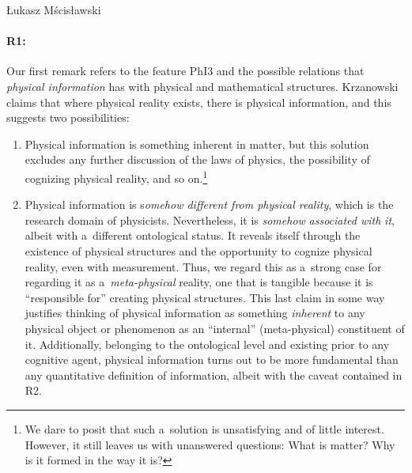 \begin{artengenv}{Łukasz Mścisławski}
\paragraph{R1:} Our first remark refers to the feature PhI3 and the possible relations that \textit{physical information} has with physical and mathematical structures. Krzanowski claims that where physical reality exists, there is physical information, and this suggests two possibilities:
\begin{enumerate}[label=(\alph*)]
\item Physical information is something inherent in matter, but this solution excludes any further discussion of the laws of physics, the possibility of cognizing physical reality, and so on.\footnote{We dare to posit that such a~solution is unsatisfying and of little interest. However, it still leaves us with unanswered questions: What is matter? Why is it formed in the way it is?}
\item Physical information is s\textit{omehow different from physical reality}, which is the research domain of physicists. Nevertheless, it is \textit{somehow} \textit{associated with} \textit{it}, albeit with a~different ontological status. It reveals itself through the existence of physical structures and the opportunity to cognize physical reality, even with measurement. Thus, we regard this as a~strong case for regarding it as a~\textit{meta-physical} reality, one that is tangible because it is ``responsible for'' creating physical structures. This last claim in some way justifies thinking of physical information as something \textit{inherent} to any physical object or phenomenon as an ``internal'' (meta-physical) constituent of it. Additionally, belonging to the ontological level and existing prior to any cognitive agent, physical information turns out to be more fundamental than any quantitative definition of information, albeit with the caveat contained in R2.
\end{enumerate}


\end{artengenv}
